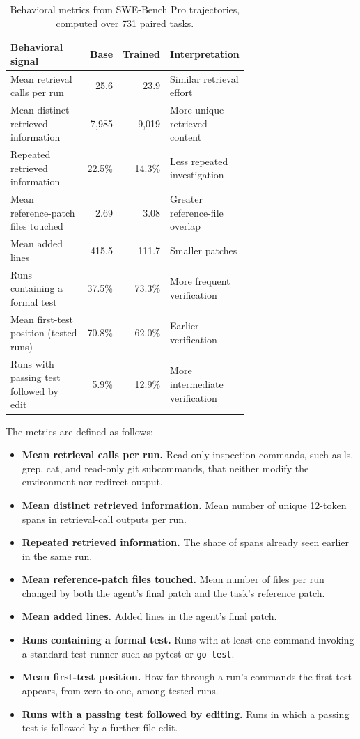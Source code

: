 \documentclass{article}
\begin{document}
\begin{table}[H]
\centering
\caption{Behavioral metrics from SWE-Bench Pro trajectories, computed over 731 paired tasks.}
\label{tab:metrics}
\begin{tabular}{p{0.38\linewidth}rrp{0.3\linewidth}}
\toprule
Behavioral signal & Base & Trained & Interpretation \\
\midrule
Mean retrieval calls per run & 25.6 & 23.9 & Similar retrieval effort \\
Mean distinct retrieved information & 7,985 & 9,019 & More unique retrieved content \\
Repeated retrieved information & 22.5\% & 14.3\% & Less repeated investigation \\
Mean reference-patch files touched & 2.69 & 3.08 & Greater reference-file overlap \\
Mean added lines & 415.5 & 111.7 & Smaller patches \\
Runs containing a formal test & 37.5\% & 73.3\% & More frequent verification \\
Mean first-test position (tested runs) & 70.8\% & 62.0\% & Earlier verification \\
Runs with passing test followed by edit & 5.9\% & 12.9\% & More intermediate verification \\
\bottomrule
\end{tabular}
\end{table}

The metrics are defined as follows:

\begin{itemize}
  \item \textbf{Mean retrieval calls per run.} Read-only inspection commands, such as ls, grep, cat, and read-only git subcommands, that neither modify the environment nor redirect output.
  \item \textbf{Mean distinct retrieved information.} Mean number of unique 12-token spans in retrieval-call outputs per run.
  \item \textbf{Repeated retrieved information.} The share of spans already seen earlier in the same run.
  \item \textbf{Mean reference-patch files touched.} Mean number of files per run changed by both the agent's final patch and the task's reference patch.
  \item \textbf{Mean added lines.} Added lines in the agent's final patch.
  \item \textbf{Runs containing a formal test.} Runs with at least one command invoking a standard test runner such as pytest or \texttt{go test}.
  \item \textbf{Mean first-test position.} How far through a run's commands the first test appears, from zero to one, among tested runs.
  \item \textbf{Runs with a passing test followed by editing.} Runs in which a passing test is followed by a further file edit.
\end{itemize}
\end{document}
